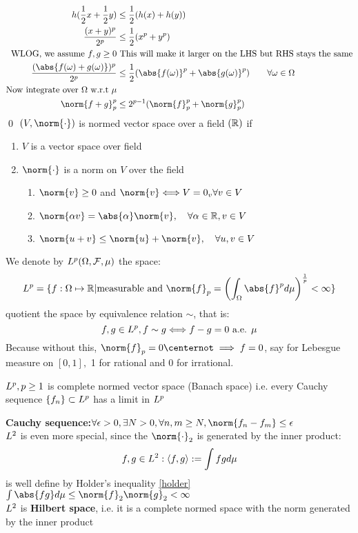 \begin{align*}
    h(\frac{1}{2}x + \frac{1}{2}y) &\leq \frac{1}{2}(h(x)+h(y)) \\
    \frac{(x+y)^p}{2^p} &\leq  \frac{1}{2}(x^p + y^p) \\
    \text{WLOG, we assume } f,g \geq 0 &\text{ This will make it larger on the LHS but RHS stays the same} \\
    \frac{(\abs{f(\omega)+g(\omega)})^p}{2^p} &\leq  \frac{1}{2}(\abs{f(\omega)}^p + \abs{g(\omega)}^p) \qquad \forall \omega \in \Omega\\
    \text{Now integrate over $\Omega$ w.r.t } \mu \\
    \norm{f+g}_p^p &\leq 2^{p-1}(\norm{f}_p^p +\norm{g}_p^p)
\end{align*}
\qed
\newpage
$(V, \norm{\cdot})$ is normed vector space over a field $(\mathbb{R})$ if
\begin{enumerate}
    \item $V$ is a vector space over field
    \item $\norm{\cdot}$ is a norm on $V$ over the field
    \begin{enumerate}
        \item $\norm{v}\geq 0$ and $\norm{v} \Longleftrightarrow V = 0_v \forall v\in V$
        \item $\norm{\alpha v} = \abs{\alpha}\norm{v}, \quad \forall\alpha\in \R, v\in V$
        \item $\norm{u+v} \leq \norm{u}+\norm{v}, \quad \forall u,v\in V$
    \end{enumerate}
\end{enumerate}
We denote by $L^{p}(\Omega, \mathcal{F}, \mu)$ the space:
\begin{equation*}
    \ls{p} = \{f:\Omega \mapsto \R| \text{measurable and } \norm{f}_p = \left( \into \abs{f}^p d\mu \right)^{\frac{1}{p}} < \infty\} 
\end{equation*}quotient the space by equivalence relation $\sim$, that is:
\begin{equation*}
    f,g\in L^{p}, f\sim g \Longleftrightarrow f-g = 0 \text{ a.e. } \mu
\end{equation*}Because without this, $\norm{f}_p = 0 \notimplies f = 0$, say for Lebesgue measure on $[0,1],$ 1 for rational and 0 for irrational.
\begin{thm}
$L^{p}, p \geq 1$ is complete normed vector space (Banach space) i.e. every Cauchy sequence $\{f_n\}\subset L^{p}$ has a limit in $L^{p}$
\end{thm}
\textbf{Cauchy sequence:}$\forall \epsilon > 0, \exists N >0 , \forall n,m \geq N, \norm{f_n - f_m} \leq \epsilon$  \\
$L^{2}$ is even more special, since the $\norm{\cdot}_2$ is generated by the inner product: \begin{equation*}
    f,g\in L^{2}: \langle f,g \rangle := \int fg d\mu
\end{equation*}is well define by Holder’s inequality \ref{holder} $\int \abs{fg} d\mu \leq \norm{f}_2\norm{g}_2 < \infty$ \\
$L^{2}$ is \textbf{Hilbert space}, i.e. it is a complete normed space with the norm generated by the inner product
\newpage 

